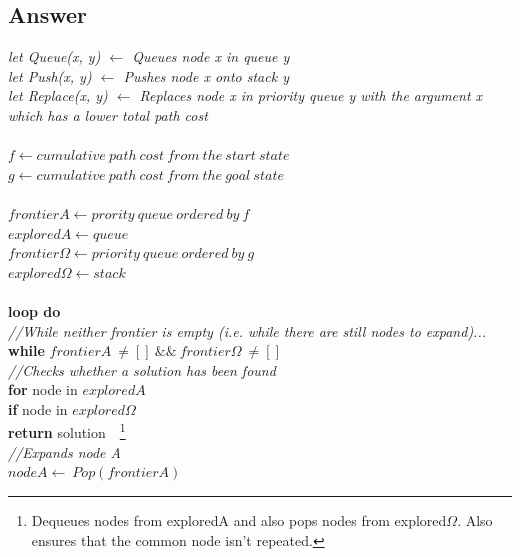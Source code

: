 \documentclass{article}
\begin{document}
\subsection{Answer}
\textit{let Queue(x, y) $\leftarrow$ Queues node x in queue y} \\
\textit{let Push(x, y) $\leftarrow$ Pushes node x onto stack y} \\
\textit{let Replace(x, y) $\leftarrow$ Replaces node x in priority queue y with the argument x which has a lower total path cost}
\\~\\
$f \leftarrow cumulative\ path\ cost\ from\ the\ start\ state$ \\
$g \leftarrow cumulative\ path\ cost\ from\ the\ goal\ state$
\\~\\
$frontierA \leftarrow prority\ queue\ ordered\ by\ f$ \\
$exploredA \leftarrow queue$ \\
$frontier\Omega \leftarrow priority\ queue\ ordered\ by\ g$ \\
$explored\Omega \leftarrow stack$
\\~\\
\textbf{loop do}\\
\-\hspace{10mm} \textit{//While neither frontier is empty (i.e. while there are still nodes to expand)...}\\
\-\hspace{10mm} \textbf{while} $frontierA\ \neq []\ \&\&\ frontier\Omega\ \neq []$\\
\-\hspace{20mm} \textit{//Checks whether a solution has been found} \\
\-\hspace{20mm} \textbf{for} node in $exploredA$ \\ 
\-\hspace{30mm} \textbf{if} node in $explored\Omega$ \\
\-\hspace{40mm} \textbf{return} solution\ \ \footnote{Dequeues nodes from exploredA and also pops nodes from explored$\Omega$. Also ensures that the common node isn't repeated.} \\ 
\-\hspace{20mm} \textit{//Expands node A} \\
\-\hspace{20mm} $nodeA \leftarrow \ Pop(frontierA)$ \\
\end{document}
